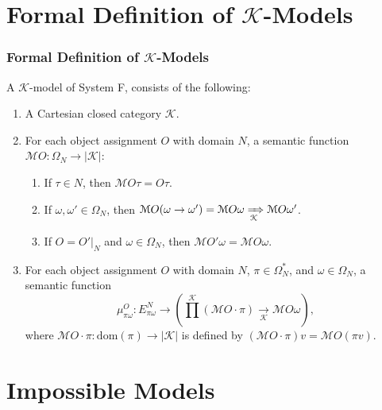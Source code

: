 \section{Formal Definition of $\mathcal{K}$-Models}

\watermarkoff
\begin{frame}[fragile]
    \frametitle{Formal Definition of $\mathcal{K}$-Models}

    A $\mathcal{K}$-model of System F, consists of the following:
    \begin{enumerate}
        \item A Cartesian closed category $\mathcal{K}$.
        \item For each object assignment $O$ with domain $N$, a semantic function $\mathcal{M}O \colon \Omega_N \rightarrow |\mathcal{K}|$:
        \begin{enumerate}
            \item If $\tau \in N$, then $\mathcal{M}O\tau = O\tau$.
            \item If $\omega, \omega' \in \Omega_N$, then $\mathcal{M}O(\omega \rightarrow \omega') = \mathcal{M}O\omega \xRightarrow[\mathcal{K}]{} \mathcal{M}O\omega'$.
            \item If $O = O'|_N$ and $\omega \in \Omega_N$, then $\mathcal{M}O'\omega = \mathcal{M}O\omega$.
        \end{enumerate}
        \item For each object assignment $O$ with domain $N$, $\pi \in \Omega^*_N$, and $\omega \in \Omega_N$, a semantic function 
        \[
        \mu^O_{\pi\omega} \colon E^N_{\pi\omega} \rightarrow \left(\prod^\mathcal{K}\left(\mathcal{M}O \cdot \pi\right) \xrightarrow[\mathcal{K}]{} \mathcal{M}O\omega\right),
        \]
        where $\mathcal{M}O \cdot \pi \colon \mathrm{dom}(\pi) \rightarrow |\mathcal{K}|$ is defined by $(\mathcal{M}O \cdot \pi)v = \mathcal{M}O(\pi v)$.
    \end{enumerate}
\end{frame}

\section{Impossible Models}

